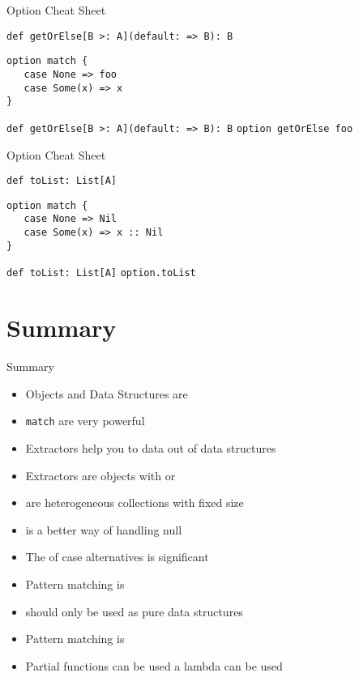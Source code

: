 \begin{frame}[fragile]{Option Cheat Sheet}
\begin{alertblock}{\lstinline!def getOrElse[B >: A](default: => B): B!}
\begin{lstlisting}
option match {
   case None => foo
   case Some(x) => x
}
\end{lstlisting}
\end{alertblock}
\begin{exampleblock}{\lstinline!def getOrElse[B >: A](default: => B): B!}
\lstinline!option getOrElse foo!
\end{exampleblock}
\end{frame}

\begin{frame}[fragile]{Option Cheat Sheet}
\begin{alertblock}{\lstinline!def toList: List[A]!}
\begin{lstlisting}
option match {
   case None => Nil
   case Some(x) => x :: Nil
}
\end{lstlisting}
\end{alertblock}
\begin{exampleblock}{\lstinline!def toList: List[A]!}
\lstinline!option.toList!
\end{exampleblock}
\end{frame}

\section{Summary}
\begin{frame}{Summary}
\begin{itemize}
  \item Objects and Data Structures are 
  \item \lstinline!match!  are very powerful
  \item Extractors help you to  data out of data structures
  \item Extractors are objects with  or 
  \item {} are heterogeneous collections with fixed size
  \item {} is a better way of handling \alert{null}
  \item The  of case alternatives is significant
  \item Pattern matching is 
  \item {} should only be used as pure data structures
  \item Pattern matching is 
  \item Partial functions can be used  a lambda can be used  
\end{itemize}
\end{frame}